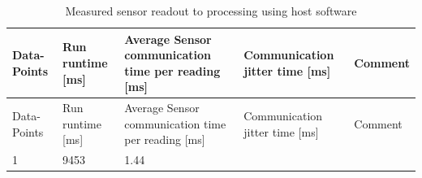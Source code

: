\begin{longtable}[]{@{}lllll@{}}
\caption{Measured sensor readout to processing using host software
\label{Measured_sensor_readout_to_processing_using_host_software.csv}}\tabularnewline
\toprule
\begin{minipage}[b]{0.08\columnwidth}\raggedright
Data-Points\strut
\end{minipage} & \begin{minipage}[b]{0.11\columnwidth}\raggedright
Run runtime {[}ms{]}\strut
\end{minipage} & \begin{minipage}[b]{0.35\columnwidth}\raggedright
Average Sensor communication time per reading {[}ms{]}\strut
\end{minipage} & \begin{minipage}[b]{0.22\columnwidth}\raggedright
Communication jitter time {[}ms{]}\strut
\end{minipage} & \begin{minipage}[b]{0.10\columnwidth}\raggedright
Comment\strut
\end{minipage}\tabularnewline
\midrule
\endfirsthead
\toprule
\begin{minipage}[b]{0.08\columnwidth}\raggedright
Data-Points\strut
\end{minipage} & \begin{minipage}[b]{0.11\columnwidth}\raggedright
Run runtime {[}ms{]}\strut
\end{minipage} & \begin{minipage}[b]{0.35\columnwidth}\raggedright
Average Sensor communication time per reading {[}ms{]}\strut
\end{minipage} & \begin{minipage}[b]{0.22\columnwidth}\raggedright
Communication jitter time {[}ms{]}\strut
\end{minipage} & \begin{minipage}[b]{0.10\columnwidth}\raggedright
Comment\strut
\end{minipage}\tabularnewline
\midrule
\endhead
\begin{minipage}[t]{0.08\columnwidth}\raggedright
1\strut
\end{minipage} & \begin{minipage}[t]{0.11\columnwidth}\raggedright
9453\strut
\end{minipage} & \begin{minipage}[t]{0.35\columnwidth}\raggedright
1.44\strut
\end{minipage} & \begin{minipage}[t]{0.22\columnwidth}\raggedright

\end{minipage}
\end{longtable}
